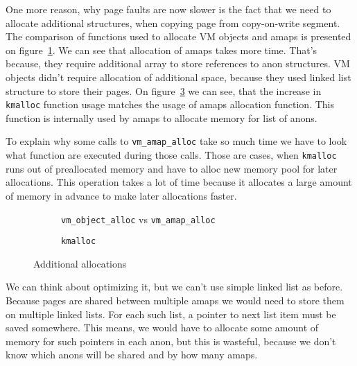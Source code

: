One more reason, why page faults are now slower is the fact that we need to allocate additional structures, when copying page from copy-on-write segment.
The comparison of functions used to allocate VM objects and amaps is presented on figure~\ref{histogram:alloc}.
We can see that allocation of amaps takes more time.
That's because, they require additional array to store references to anon structures.
VM objects didn't require allocation of additional space, because they used linked list structure to store their pages.
On figure~\ref{histogram:kmalloc} we can see, that the increase in \texttt{kmalloc} function usage matches the usage of amaps allocation function.
This function is internally used by amaps to allocate memory for list of anons.

To explain why some calls to \texttt{vm_amap_alloc} take so much time we have to look what function are executed during those calls.
Those are cases, when \texttt{kmalloc} runs out of preallocated memory and have to alloc new memory pool for later allocations.
This operation takes a lot of time because it allocates a large amount of memory in advance to make later allocations faster.

\begin{figure}[h]
  \begin{subfigure}{0.45\textwidth}
    \centering
    \caption{\texttt{vm_object_alloc} vs \texttt{vm_amap_alloc}}
    \label{histogram:alloc}
  \end{subfigure}
  \hfill
  \begin{subfigure}{0.45\textwidth}
    \centering
    \caption{\texttt{kmalloc}}
    \label{histogram:kmalloc}
  \end{subfigure}
  \caption{Additional allocations}
\end{figure}

We can think about optimizing it, but we can't use simple linked list as before.
Because pages are shared between multiple amaps we would need to store them on multiple linked lists.
For each such list, a pointer to next list item must be saved somewhere.
This means, we would have to allocate some amount of memory for such pointers in each anon, but this is wasteful,
because we don't know which anons will be shared and by how many amaps.

